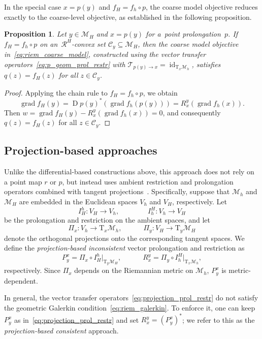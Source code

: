 \documentclass[11pt,reqno]{amsart}
\theoremstyle{plain}
\newtheorem{prop}[thm]{Proposition}
\DeclareMathOperator{\Drm}{D}
\DeclareMathOperator{\grad}{grad}
\DeclareMathOperator{\id}{id}
\newcommand\calC{\mathcal C}
\newcommand\calT{\mathcal T}
\newcommand{\M}{\mathcal{M}}
\newcommand{\Tan}{\mathrm{T}}
\newcommand{\Ret}{\mathcal R}
\begin{document}
	In the special case $x = p(y)$ and $f_H = f_h \circ p$, the coarse model objective reduces exactly to the coarse-level objective, as established in the following proposition.
	
	\begin{prop}\label{prop:algebraic2}
		Let $y \in \M_H$ and $x = p(y)$ for a~point prolongation~$p$. If 
		$f_H = f_h \circ p$ on an~$\Ret^H$-convex set $\calC_y \subseteq \M_H$, 
		then the coarse model objective in~\eqref{eq:riem_coarse_model}, constructed using  the vector transfer operators~\eqref{eq:p_geom_prol_restr} with 
		\mbox{$\calT_{p(y)\to x} = \id_{\Tan_x\M_h}$}, satisfies $q(z) = f_H(z)$ for all 
		$z \in \calC_y$.
	\end{prop}
	\begin{proof}
		Applying the chain rule to $f_H = f_h \circ p$, we obtain 
		\[
		\grad f_H(y) = \Drm p(y)^\ast(\grad f_h(p(y))) = R_x^y(\grad f_h(x)).
		\]
		Then $w = \grad f_H(y) - R_x^y(\grad f_h(x)) = 0$, and consequently 
		$q(z) = f_H(z)$ for all $z \in \calC_y$.
	\end{proof}
	
	\subsection{Projection-based approaches}\label{sec:projection-based}
	
	Unlike the differential-based constructions above, this approach does not 
	rely on a point map $r$ or $p$, but instead uses ambient restriction and prolongation operators combined with tangent projections~\cite{SutV2021}. Specifically, suppose that $\M_h$ and $\M_H$ are embedded in the Euclidean spaces $V_h$ and $V_H$, respectively. Let
	\[
	I_H^h:V_H\to V_h, \qquad\qquad 
	I_h^H:V_h\to V_H
	\] 
	be the prolongation and restriction on the ambient spaces, and let 
	\[
	\Pi_x:V_h \to \Tan_x\M_h, \qquad\quad 
	\Pi_y:V_H \to \Tan_y\M_H
	\]
	denote the orthogonal projections onto the corresponding tangent spaces. We 
	define the \emph{projection-based inconsistent} vector prolongation and restriction as
	\begin{equation} \label{eq:projection_prol_restr}
		P_y^x = \Pi_x \circ I_H^h\big|_{\Tan_y\M_H}, \qquad\quad
		R_x^y = \Pi_y \circ I_h^H\big|_{\Tan_x\M_h},
	\end{equation}
	respectively. Since $\Pi_x$ depends on the Riemannian metric on $\M_h$, $P_y^x$ is metric-dependent. 
	
	In general, the vector transfer operators~\eqref{eq:projection_prol_restr} do not satisfy the geometric Galerkin condition~\eqref{eq:riem_galerkin}. To enforce it, one can keep $P_y^x$ as in~\eqref{eq:projection_prol_restr} and set $R_x^y = (P_y^x)^\ast$; we refer to this as the \emph{projection-based consistent} approach.
	
\end{document}
